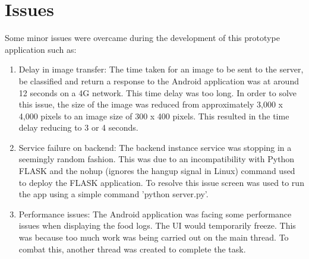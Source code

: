 \section{Issues}
Some minor issues were overcame during the development of this prototype application such as:
\begin{enumerate}
	\item{Delay in image transfer: The time taken for an image to be sent to the server, be classified and return a response to the Android application was at around 12 seconds on a 4G network. This time delay was too long. In order to solve this issue, the size of the image was reduced from approximately 3,000 x 4,000 pixels to an image size of 300 x 400 pixels. This resulted in the time delay reducing to 3 or 4 seconds.}
	\item{Service failure on backend: The backend instance service was stopping in a seemingly random fashion. This was due to an incompatibility with Python FLASK and the nohup (ignores the hangup signal in Linux) command used to deploy the FLASK application. To resolve this issue screen was used to run the app using a simple command 'python server.py'.}
	\item{Performance issues: The Android application was facing some performance issues when displaying the food logs. The UI would temporarily freeze. This was because too much work was being carried out on the main thread. To combat this, another thread was created to complete the task.}
\end{enumerate}
